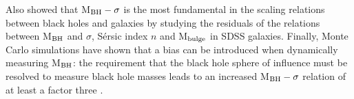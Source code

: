 Also \citet{2017MNRAS.466.4029S} showed that M$_{\rm BH}-\sigma$ is the most fundamental in the scaling relations between black holes and galaxies by studying the residuals of the relations between M$_{\rm BH}$ and $\sigma$, S\'{e}rsic index $n$ and M$_{\rm bulge}$ in SDSS galaxies. Finally, Monte Carlo simulations have shown that a bias can be introduced when dynamically measuring M$_{\rm BH}$: the requirement that the black hole sphere of influence must be resolved to measure black hole masses leads to an increased M$_{\rm BH}-\sigma$ relation of at least a factor three \citep{2016MNRAS.460.3119S}.

